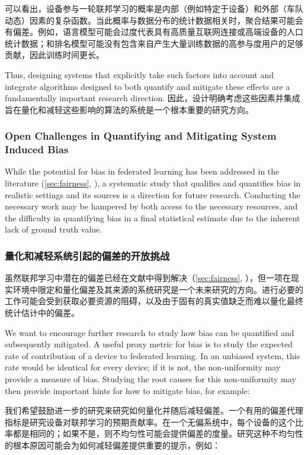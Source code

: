 可以看出，设备参与一轮联邦学习的概率是内部（例如特定于设备）和外部（车队动态）因素的复杂函数。当此概率与数据分布的统计数据相关时，聚合结果可能会有偏差。例如，语言模型可能会过度代表具有高质量互联网连接或高端设备的人口统计数据；和排名模型可能没有包含来自产生大量训练数据的高参与度用户的足够贡献，因此训练时间更长。

Thus, designing systems that explicitly take such factors into account and integrate algorithms designed to both quantify and mitigate these effects are a fundamentally important research direction.
因此，设计明确考虑这些因素并集成旨在量化和减轻这些影响的算法的系统是一个根本重要的研究方向。

\subsubsection{Open Challenges in Quantifying and Mitigating System Induced Bias}
While the potential for bias in federated learning has been addressed in the literature (\cref{sec:fairness}, \citep{bonawitz19sysml, li2019fair, eichner19semicyclic}), a systematic study that qualifies and quantifies bias in realistic settings and its sources is a direction for future research. Conducting the necessary work may be hampered by both access to the necessary resources, and the difficulty in quantifying bias in a final statistical estimate due to the inherent lack of ground truth value.

\subsubsection*{量化和减轻系统引起的偏差的开放挑战}
虽然联邦学习中潜在的偏差已经在文献中得到解决（\cref{sec:fairness}, \citep{bonawitz19sysml, li2019fair, eichner19semicyclic}），但一项在现实环境中限定和量化偏差及其来源的系统研究是一个未来研究的方向。进行必要的工作可能会受到获取必要资源的阻碍，以及由于固有的真实值缺乏而难以量化最终统计估计中的偏差。

We want to encourage further research to study how bias can be quantified and subsequently mitigated. A useful proxy metric for bias is to study the expected rate of contribution of a device to federated learning. In an unbiased system, this rate would be identical for every device; if it is not, the non-uniformity may provide a measure of bias. Studying the root causes for this non-uniformity may then provide important hints for how to mitigate bias, for example:

我们希望鼓励进一步的研究来研究如何量化并随后减轻偏差。一个有用的偏差代理指标是研究设备对联邦学习的预期贡献率。在一个无偏系统中，每个设备的这个比率都是相同的；如果不是，则不均匀性可能会提供偏差的度量。研究这种不均匀性的根本原因可能会为如何减轻偏差提供重要的提示，例如：

